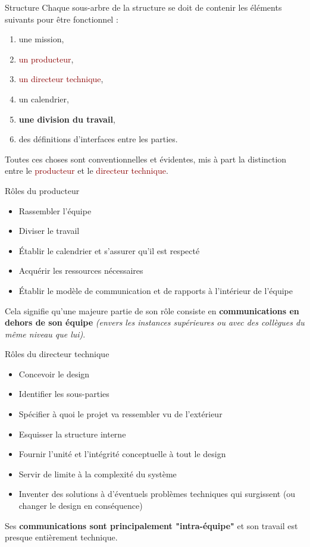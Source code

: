 \documentclass{beamer}
\newcommand{\red}[1]{\textcolor{darkred}{#1}}
\begin{document}
\begin{frame}{Structure}
Chaque sous-arbre de la structure se doit de contenir les éléments suivants pour être fonctionnel :
\begin{enumerate}
\pause \item une mission,
\pause \item \red{un producteur},
\pause \item \red{un directeur technique},
\pause \item un calendrier,
\pause \item \textbf{une division du travail},
\pause \item des définitions d'interfaces entre les parties.
\end{enumerate}
Toutes ces choses sont conventionnelles et évidentes, mis à part la distinction entre le \red{producteur} et le \red{directeur 
technique}.
\end{frame}

\begin{frame}{Rôles du producteur}
\begin{itemize}
\item Rassembler l'équipe
\pause \item Diviser le travail
\pause \item Établir le calendrier et s'assurer qu'il est respecté
\pause \item Acquérir les ressources nécessaires
\pause \item Établir le modèle de communication et de rapports à l'intérieur de l'équipe
\end{itemize}
\pause Cela signifie qu'une majeure partie de son rôle consiste en \textbf{communications en dehors de son équipe} 
\textit{(envers les instances supérieures ou avec des collègues du même niveau que lui)}.
\end{frame}

\begin{frame}{Rôles du directeur technique}
\begin{itemize}
\item Concevoir le design
\pause\item Identifier les sous-parties
\pause\item Spécifier à quoi le projet va ressembler vu de l'extérieur
\pause\item Esquisser la structure interne
\pause\item Fournir l'unité et l'intégrité conceptuelle à tout le design
\pause\item Servir de limite à la complexité du système
\pause\item Inventer des solutions à d'éventuels problèmes techniques qui surgissent (ou changer le design en conséquence)
\end{itemize}
\pause Ses \textbf{communications sont principalement "intra-équipe"} et son travail est presque entièrement technique.\\
\end{frame}
\end{document}
